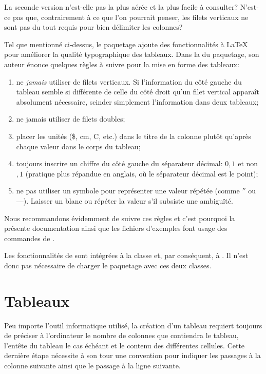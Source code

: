 La seconde version n'est-elle pas la plus aérée et la plus facile à
consulter? N'est-ce pas que, contrairement à ce que l'on pourrait
penser, les filets verticaux ne sont pas du tout requis pour bien
délimiter les colonnes?

Tel que mentionné ci-dessus, le paquetage  ajoute des
fonctionnalités à {\LaTeX} pour améliorer la qualité typographique des
tableaux. Dans la %
du paquetage, son auteur énonce quelques règles à suivre pour la mise
en forme des tableaux:
\begin{enumerate}
\item ne \emph{jamais} utiliser de filets verticaux. Si l'information
  du côté gauche du tableau semble si différente de celle du côté
  droit qu'un filet vertical apparaît absolument nécessaire, scinder
  simplement l'information dans deux tableaux;
\item ne jamais utiliser de filets doubles;
\item placer les unités (\$, cm, {\textdegree}C, etc.) dans le titre
  de la colonne plutôt qu'après chaque valeur dans le corps du
  tableau;
\item toujours inscrire un chiffre du côté gauche du séparateur
  décimal: $0,1$ et non $,1$ (pratique plus répandue en anglais, où le
  séparateur décimal est le point);
\item ne pas utiliser un symbole pour représenter une valeur
  répétée (comme $''$ ou ---). Laisser un blanc ou répéter la
  valeur s'il subsiste une ambiguïté.
\end{enumerate}

Nous recommandons évidemment de suivre ces règles et c'est pourquoi la
présente documentation ainsi que les fichiers d'exemples font usage
des commandes de .

Les fonctionnalités de  sont intégrées à la classe
 et, par conséquent, à . Il n'est donc pas
nécessaire de charger le paquetage avec ces deux classes.



\section{Tableaux}
\label{sec:tableaux:tableaux}

Peu importe l'outil informatique utilisé, la création d'un tableau
requiert toujours de préciser à l'ordinateur le nombre de colonnes que
contiendra le tableau, l'entête du tableau le cas échéant et le contenu
des différentes cellules. Cette dernière étape nécessite à son tour
une convention pour indiquer les passages à la colonne suivante
ainsi que le passage à la ligne suivante.

